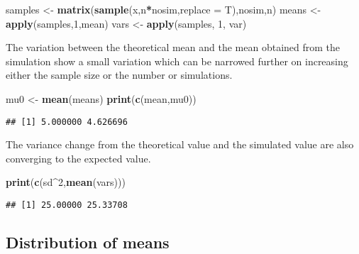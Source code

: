 \documentclass[
]{article}
\newenvironment{Shaded}{\begin{snugshade}}{\end{snugshade}}
\newcommand{\DataTypeTok}[1]{\textcolor[rgb]{0.13,0.29,0.53}{#1}}
\newcommand{\DecValTok}[1]{\textcolor[rgb]{0.00,0.00,0.81}{#1}}
\newcommand{\KeywordTok}[1]{\textcolor[rgb]{0.13,0.29,0.53}{\textbf{#1}}}
\newcommand{\NormalTok}[1]{#1}
\newcommand{\OperatorTok}[1]{\textcolor[rgb]{0.81,0.36,0.00}{\textbf{#1}}}
\newcommand{\StringTok}[1]{\textcolor[rgb]{0.31,0.60,0.02}{#1}}
\begin{document}
\begin{Shaded}
\begin{Highlighting}[]
\NormalTok{samples <-}\StringTok{ }\KeywordTok{matrix}\NormalTok{(}\KeywordTok{sample}\NormalTok{(x,n}\OperatorTok{*}\NormalTok{nosim,}\DataTypeTok{replace =}\NormalTok{ T),nosim,n)}
\NormalTok{means <-}\StringTok{ }\KeywordTok{apply}\NormalTok{(samples,}\DecValTok{1}\NormalTok{,mean)}
\NormalTok{vars <-}\StringTok{ }\KeywordTok{apply}\NormalTok{(samples, }\DecValTok{1}\NormalTok{, var)}
\end{Highlighting}
\end{Shaded}

The variation between the theoretical mean and the mean obtained from
the simulation show a small variation which can be narrowed further on
increasing either the sample size or the number or simulations.

\begin{Shaded}
\begin{Highlighting}[]
\NormalTok{mu0 <-}\StringTok{ }\KeywordTok{mean}\NormalTok{(means)}
\KeywordTok{print}\NormalTok{(}\KeywordTok{c}\NormalTok{(mean,mu0))}
\end{Highlighting}
\end{Shaded}

\begin{verbatim}
## [1] 5.000000 4.626696
\end{verbatim}

The variance change from the theoretical value and the simulated value
are also converging to the expected value.

\begin{Shaded}
\begin{Highlighting}[]
\KeywordTok{print}\NormalTok{(}\KeywordTok{c}\NormalTok{(sd}\OperatorTok{^}\DecValTok{2}\NormalTok{,}\KeywordTok{mean}\NormalTok{(vars)))}
\end{Highlighting}
\end{Shaded}

\begin{verbatim}
## [1] 25.00000 25.33708
\end{verbatim}

\hypertarget{distribution-of-means}{%
\subsection{Distribution of means}\label{distribution-of-means}}
\end{document}
